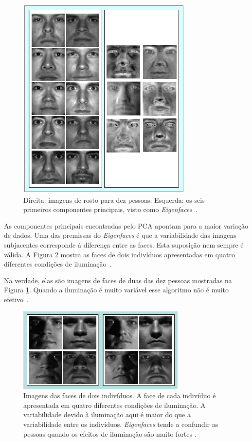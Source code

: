 	\begin{figure}[H]
		\begin{center}
			\includegraphics[scale=1.2]{figuras/2.FundamentacaoTeorica/eigenfaces.png}
		\end{center}
		\caption{Direita: imagens de rosto para dez pessoas. Esquerda: os seis primeiros componentes principais, visto como \textit{Eigenfaces}~\cite{hewitt}.}
		\label{exemploEigenfaces}
	\end{figure}

As componentes principais encontradas pelo PCA apontam para a maior variação de dados. Uma das premissas do \textit{Eigenfaces} é que a variabilidade das imagens subjacentes corresponde à diferença entre as faces. Esta suposição nem sempre é válida. A Figura \ref{exemplosImagensIluminacaoo} mostra as faces de dois indivíduos apresentadas em quatro diferentes condições de iluminação~\cite{hewitt}.

Na verdade, elas são imagens de faces de duas das dez pessoas mostradas na Figura \ref{exemploEigenfaces}. Quando a iluminação é muito variável esse algoritmo não é muito efetivo~\cite{hewitt}.

	\begin{figure}[H]
		\begin{center}
			\includegraphics[scale=1.2]{figuras/2.FundamentacaoTeorica/exemplosImagensIluminacaoo.png}
		\end{center}
		\caption{Imagens das faces de dois indivíduos. A face de cada indivíduo é apresentada em quatro diferentes condições de iluminação. A variabilidade devido à iluminação aqui é maior do que a variabilidade entre os indivíduos. \textit{Eigenfaces} tende a confundir as pessoas quando os efeitos de iluminação são muito fortes \cite{hewitt}.}
		\label{exemplosImagensIluminacaoo}
	\end{figure}

